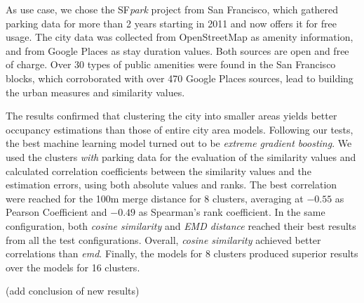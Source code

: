 As use case, we chose the SF\textit{park} project from San Francisco, which gathered parking data for more than 2 years starting in 2011 and now offers it for free usage.
The city data was collected from OpenStreetMap as amenity information, and from Google Places as stay duration values.
Both sources are open and free of charge.
Over 30 types of public amenities were found in the San Francisco blocks, which corroborated with over 470 Google Places sources, lead to building the urban measures and similarity values. 

The results confirmed that clustering the city into smaller areas yields better occupancy estimations than those of entire city area models.
Following our tests, the best machine learning model turned out to be \textit{extreme gradient boosting}.
We used the clusters \textit{with} parking data for the evaluation of the similarity values and calculated correlation coefficients between the similarity values and the estimation errors, using both absolute values and ranks.
The best correlation were reached for the 100m merge distance for 8 clusters, averaging at $-0.55$ as Pearson Coefficient and $-0.49$ as Spearman's rank coefficient.
In the same configuration, both \textit{cosine similarity} and \textit{EMD distance} reached their best results from all the test configurations.
Overall, \textit{cosine similarity} achieved better correlations than \textit{emd}.
Finally, the models for 8 clusters produced superior results over the models for 16 clusters. 

{\color{green}(add conclusion of new results)}

%

